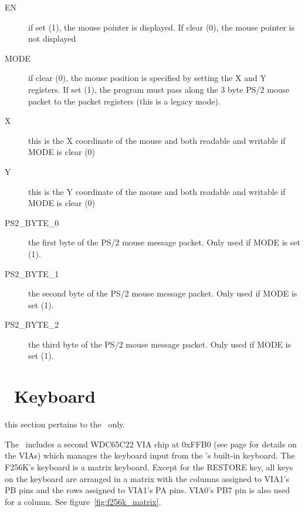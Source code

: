 \begin{description}
    \item[EN] if set (1), the mouse pointer is displayed. If clear (0), the mouse pointer is not displayed
    \item[MODE] if clear (0), the mouse position is specified by setting the X and Y registers. If set (1), the program must pass along the 3 byte PS/2 mouse packet to the packet registers (this is a legacy mode).
    \item[X] this is the X coordinate of the mouse and both readable and writable if MODE is clear (0)
    \item[Y] this is the Y coordinate of the mouse and both readable and writable if MODE is clear (0)
    \item[PS2\_BYTE\_0] the first byte of the PS/2 mouse message packet. Only used if MODE is set (1).
    \item[PS2\_BYTE\_1] the second byte of the PS/2 mouse message packet. Only used if MODE is set (1).
    \item[PS2\_BYTE\_2] the third byte of the PS/2 mouse message packet. Only used if MODE is set (1).
\end{description}

\section*{\fk\ Keyboard}
\label{sec_f256k_kbd}

\begin{note}
    this section pertains to the \fk\ only.
\end{note}

The \fk\ includes a second WDC65C22 VIA chip at 0xFFB0 (see page \pageref{chap_via} for details on the VIAs) which manages the keyboard input from the \fk's built-in keyboard. The F256K's keyboard is a matrix keyboard. Except for the RESTORE key, all keys on the keyboard are arranged in a matrix with the columns assigned to VIA1's PB pins and the rows assigned to VIA1's PA pins. VIA0's PB7 pin is also used for a column. See figure~\ref{fig:f256k_matrix}.

